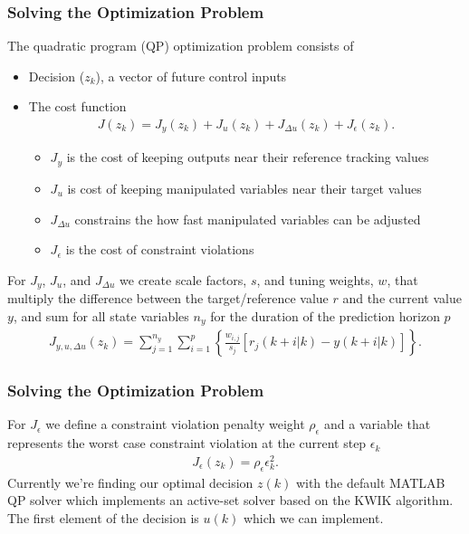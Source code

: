\documentclass[aspectratio=169]{beamer}
\begin{document}
\begin{frame}[t]
    \frametitle{Solving the Optimization Problem}
    The quadratic program (QP) optimization problem consists of
    \begin{itemize}
        \item Decision ($z_k$), a vector of future control inputs
        \item The cost function
            \begin{align*}
                J(z_k) = J_y(z_k) + J_u (z_k) + J_{\Delta u}(z_k) + J_{\epsilon} (z_k)
            .\end{align*}
            \begin{itemize}
                \item $J_y$ is the cost of keeping outputs near their reference tracking values
                \item $J_u$ is cost of keeping manipulated variables near their target values
                \item $J_{\Delta u}$ constrains the how fast manipulated variables can be adjusted
                \item $J_{\epsilon}$ is the cost of constraint violations
            \end{itemize}
    \end{itemize}
    For $J_y$, $J_u$, and $J_{\Delta u}$ we create scale factors, $s$, and tuning weights, $w$, that
    multiply the difference between the target/reference value $r$ and the current value $y$, and sum for
    all state variables $n_y$ for the duration of the prediction horizon $p$
    \begin{align*}
        J_{y, u, \Delta u}(z_k) = \sum_{j=1}^{n_y} \sum_{i=1}^{p} \left\{ \frac{w_{i, j}}{s_j}
        \left[ r_j \left( k+i|k \right) - y\left( k+i|k \right)  \right]  \right\} 
    .\end{align*}
\end{frame}

\begin{frame}[t]
    \frametitle{Solving the Optimization Problem}
    For $J_{\epsilon}$ we define a constraint violation penalty weight $\rho_{\epsilon}$ and a
    variable that represents the worst case constraint violation at the current step $\epsilon_k$ 
    \begin{align*}
        J_{\epsilon}(z_k) = \rho_{\epsilon} \epsilon_k ^2
    .\end{align*}
    Currently we're finding our optimal decision $z(k)$ with the default MATLAB QP
    solver which implements an active-set solver based on the KWIK algorithm. The first element of
    the decision is $u(k)$ which we can implement.
\end{frame}
\end{document}
